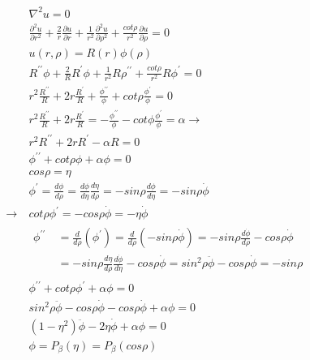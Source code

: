 \begin{equation*}
	\begin{aligned}
		{} &\
		\nabla^2u=0
		\\ &\
		\frac{\partial^2 u}{\partial r^2}+\frac{2}{r}\frac{\partial u}{\partial r}+\frac{1}{r^2}\frac{\partial^2 u}{\partial \rho^2}+\frac{cot \rho}{r^2}\frac{\partial u}{\partial \rho}=0
		\\ &\
		u(r,\rho)=R(r)\phi(\rho)
		\\ &\
		R^{\prime \prime}\phi+\frac{2}{R}R^\prime \phi +\frac{1}{r^2}R\rho^{\prime\prime}+\frac{cot \rho}{r^2}R\phi^\prime=0
		\\ &\
		r^2 \frac{R^{\prime\prime}}{R}+2r\frac{R^\prime}{R}+\frac{\phi^{\prime\prime}}{\phi}+cot \rho \frac{\phi^\prime}{\phi}=0
		\\ &\
		r^2\frac{R^{\prime\prime}}{R}+2r\frac{R^\prime}{R}=-\frac{\phi^{\prime\prime}}{\phi}-cot \phi \frac{\phi^\prime}{\phi}=\alpha\rightarrow
		\\ &\
		r^2R^{\prime\prime}+2rR^\prime-\alpha R=0
		\\ &\
		\phi^{\prime\prime}+cot \rho \phi +\alpha \phi=0
		\\ &\
		cos \rho = \eta
		\\ &\
		\phi^\prime=\frac{d\phi}{d\rho}=\frac{d\phi}{d\eta}\frac{d\eta}{d\rho}=-sin \rho \frac{d\phi}{d\eta}=-sin \rho \dot{\phi}
		\\
		\rightarrow &\
		cot \rho \phi^\prime = -cos \rho \dot{\phi}=-\eta \dot{\phi}
		\\ &\
		\begin{aligned}
			\phi^{\prime\prime} 
			{} &\
			=\frac{d}{d\rho}\left(\phi^\prime\right)=\frac{d}{d\rho}\left(-sin \rho \dot{\phi}\right)=-sin \rho \frac{d \dot{\phi}}{d\rho}-cos \rho \dot{\phi}
			\\ &\
			= -sin \rho \frac{d\eta}{d\rho}\frac{d\dot{\phi}}{d\eta}-cos \rho \dot{\phi}=sin^2 \rho \ddot{\phi}-cos \rho \dot{\phi}=-sin \rho
			\end{aligned}
		\\ &\
		\phi^{\prime\prime}+cot \rho \phi^\prime+\alpha \phi=0
		\\ &\
		sin^2 \rho \ddot{\phi}-cos \rho\dot{\phi}-cos \rho \dot{\phi}+\alpha \phi=0
		\\ &\
		\left(1-\eta^2\right)\ddot{\phi}-2\eta\dot{\phi}+\alpha\phi=0
		\\ &\
		\phi=P_\beta(\eta)=P_\beta\left(cos \rho\right)
	\end{aligned}
\end{equation*}
